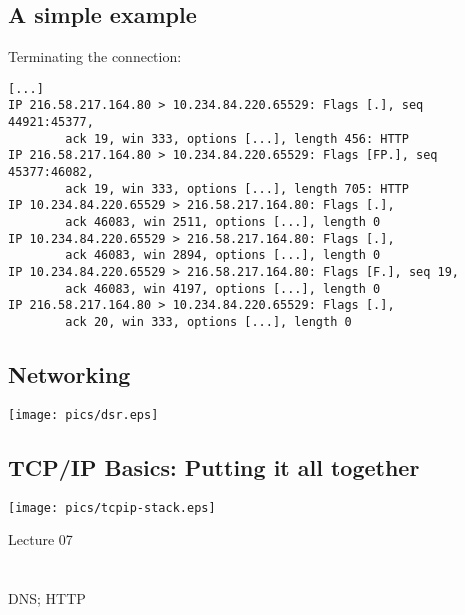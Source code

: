 \documentclass[xga]{xdvislides}
\begin{document}
\subsection{A simple example}
Terminating the connection:
\begin{verbatim}
[...]
IP 216.58.217.164.80 > 10.234.84.220.65529: Flags [.], seq 44921:45377,
        ack 19, win 333, options [...], length 456: HTTP
IP 216.58.217.164.80 > 10.234.84.220.65529: Flags [FP.], seq 45377:46082,
        ack 19, win 333, options [...], length 705: HTTP
IP 10.234.84.220.65529 > 216.58.217.164.80: Flags [.],
        ack 46083, win 2511, options [...], length 0
IP 10.234.84.220.65529 > 216.58.217.164.80: Flags [.],
        ack 46083, win 2894, options [...], length 0
IP 10.234.84.220.65529 > 216.58.217.164.80: Flags [F.], seq 19,
        ack 46083, win 4197, options [...], length 0
IP 216.58.217.164.80 > 10.234.84.220.65529: Flags [.],
        ack 20, win 333, options [...], length 0
\end{verbatim}

\subsection{Networking}
\vspace*{\fill}
\begin{center}
	\texttt{[image: pics/dsr.eps]} \\
\end{center}
\vspace*{\fill}

\subsection{TCP/IP Basics: Putting it all together}
\vspace*{\fill}
\begin{center}
	\texttt{[image: pics/tcpip-stack.eps]}
\end{center}
\vspace*{\fill}

\newpage
\vspace*{\fill}
\begin{center}
    \Hugesize
        Lecture 07 \\ [1em]
    \hspace*{5mm}
    \blueline\\
    \hspace*{5mm}\\
	DNS; HTTP
\end{center}
\vspace*{\fill}
\end{document}
